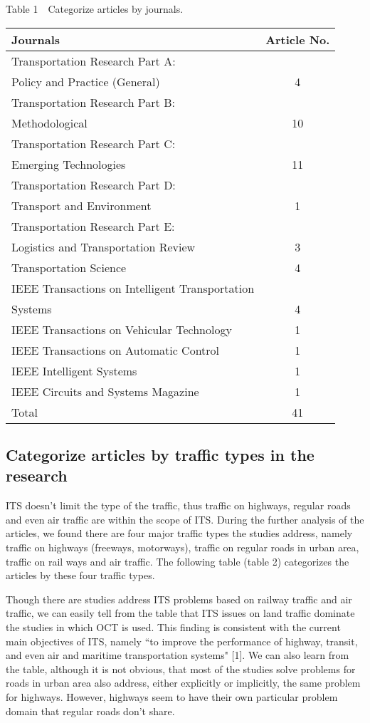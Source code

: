 \documentclass[12pt,onecolumn,twoside]{JCTA}
\theoremstyle{mystyle}
\begin{document}
\begin{center}
{Table 1~~Categorize articles by journals.}\vskip 3pt
\small{\begin{tabular}{@{ }lc@{ }} \toprule
Journals & Article No. \\\midrule
Transportation Research Part A: \\Policy and Practice (General) & 4\\ \hline 
Transportation Research Part B: \\Methodological  & 10\\ \hline 
Transportation Research Part C: \\Emerging Technologies  & 11\\ \hline 
Transportation Research Part D: \\Transport and Environment & 1\\ \hline 
Transportation Research Part E: \\Logistics and Transportation Review & 3\\ \hline 
Transportation Science & 4\\ \hline 
IEEE Transactions on Intelligent Transportation \\Systems & 4\\ \hline 
IEEE Transactions on Vehicular Technology & 1\\ \hline 
IEEE Transactions on Automatic Control & 1\\ \hline 
IEEE Intelligent Systems & 1\\ \hline 
IEEE Circuits and Systems Magazine & 1\\ \hline 
Total & 41\\
\bottomrule
\end{tabular}}
\vskip 3pt
\end{center}

\subsection{Categorize articles by traffic types in the research}
ITS doesn{\textquoteright}t limit the type of the traffic, thus traffic on highways, regular roads and even air traffic are within the scope of ITS. During the further analysis of the articles, we found there are four major traffic types the studies address, namely traffic on highways (freeways, motorways), traffic on regular roads in urban area, traffic on rail ways and air traffic. The following table (table 2) categorizes the articles by these four traffic types.

Though there are studies address ITS problems based on railway traffic and air traffic, we can easily tell from the table that ITS issues on land traffic dominate the studies in which OCT is used. This finding is consistent with the current main objectives of ITS, namely ``to improve the performance of highway, transit, and even air and maritime transportation systems" [1]. We can also learn from the table, although it is not obvious, that most of the studies solve problems for roads in urban area also address, either explicitly or implicitly, the same problem for highways. However, highways seem to have their own particular problem domain that regular roads don{\textquoteright}t share.
\end{document}
